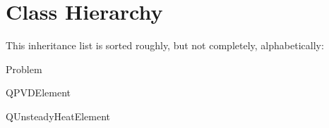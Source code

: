 \section{Class Hierarchy}
This inheritance list is sorted roughly, but not completely, alphabetically\+:\begin{DoxyCompactList}
\item Problem\begin{DoxyCompactList}
\item {}
\end{DoxyCompactList}
\item Q\+P\+V\+D\+Element\begin{DoxyCompactList}
\item {}
\end{DoxyCompactList}
\item Q\+Unsteady\+Heat\+Element\begin{DoxyCompactList}
\item {}
\end{DoxyCompactList}
\end{DoxyCompactList}
